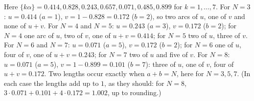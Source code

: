 \begin{solution}
Here $\{k\alpha\} = 0.414, 0.828, 0.243, 0.657, 0.071, 0.485, 0.899$ for $k = 1, \ldots, 7$. For $N = 3$: $u = 0.414$ ($a = 1$), $v = 1 - 0.828 = 0.172$ ($b = 2$), so two arcs of $u$, one of $v$ and
none of $u + v$. For $N = 4$ and $N = 5$: $u = 0.243$ ($a = 3$), $v = 0.172$ ($b = 2$); for $N = 4$ one arc of $u$, two of $v$, one of $u + v = 0.414$; for $N = 5$ two of $u$, three of $v$. For $N = 6$ and
$N = 7$: $u = 0.071$ ($a = 5$), $v = 0.172$ ($b = 2$); for $N = 6$ one of $u$, four of $v$, one of $u + v = 0.243$; for $N = 7$ two of $u$ and five of $v$. For $N = 8$: $u = 0.071$ ($a = 5$),
$v = 1 - 0.899 = 0.101$ ($b = 7$): three of $u$, one of $v$, four of $u + v = 0.172$. Two lengths occur exactly when $a + b = N$, here for $N = 3, 5, 7$. (In each case the lengths add up to $1$, as
they should: for $N = 8$, $3 \cdot 0.071 + 0.101 + 4 \cdot 0.172 = 1.002$, up to rounding.)
\end{solution}
